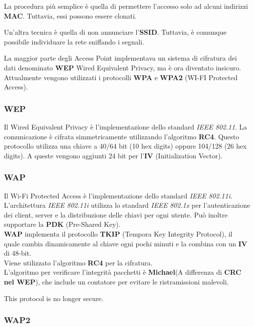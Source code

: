 \documentclass{article}
\begin{document}
La procedura più semplice è quella di permettere l'accesso solo ad alcuni indirizzi \textbf{MAC}.
Tuttavia, essi possono essere clonati.

Un'altra tecnica è quella di non annunciare l'\textbf{SSID}. Tuttavia, è comunque possibile
individuare la rete sniffando i segnali.

La maggior parte degli Access Point implementava un sistema di cifratura dei dati denominato
\textbf{WEP} Wired Equivalent Privacy, ma è ora diventato insicuro.
Attualmente vengono utilizzati i protocolli \textbf{WPA} e \textbf{WPA2} (WI-FI Protected Access).

\subsubsection{WEP}

Il Wired Equivalent Privacy è l'implementazione dello standard \textit{IEEE 802.11}.
La comunicazione è cifrata simmetricamente utilizzando l'algoritmo \textbf{RC4}.
Questo protocollo utilizza una chiave a 40/64 bit (10 hex digits) oppure 104/128 (26 hex digits).
A queste vengono aggiunti 24 bit per l'\textbf{IV} (Initialization Vector). 

\subsubsection{WAP}

Il Wi-Fi Protected Access è l'implementazione dello standard \textit{IEEE 802.11i}.
L'architettura \textit{IEEE 802.11i} utilizza lo standard \textit{IEEE 802.1x} per l'autenticazione
dei client, server e la distribuzione delle chiavi per ogni utente.
Può inoltre supportare la \textbf{PDK} (Pre-Shared Key).
\\
\textbf{WAP} implementa il protocollo \textbf{TKIP} (Tempora Key Integrity Protocol), il quale
cambia dinamicamente al chiave ogni pochi minuti e la combina con un \textbf{IV} di 48-bit.
\\
Viene utilizzato l'algoritmo \textbf{RC4} per la cifratura.
\\
L'algoritmo per verificare l'integrità pacchetti è \textbf{Michael}(A differenza di \textbf{CRC nel WEP}),
che include un contatore per evitare le ristramissioni malevoli.

This protocol is no longer secure.

\subsubsection{WAP2}
\end{document}
